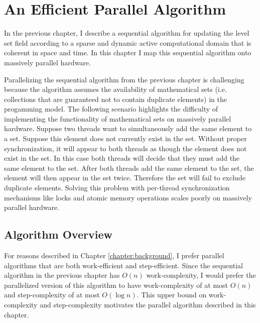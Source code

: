 \fancyhead[RO,LE]{\thepage}
\fancyfoot{} 
\chapter{An Efficient Parallel Algorithm}
\label{chapter:parallel}

In the previous chapter, I describe a sequential algorithm for updating the level set field according to a sparse and dynamic active computational domain that is coherent in space and time. In this chapter I map this sequential algorithm onto massively parallel hardware.

Parallelizing the sequential algorithm from the previous chapter is challenging because the algorithm assumes the availability of mathematical sets (i.e. collections that are guaranteed not to contain duplicate elements) in the progamming model. The following scenario highlights the difficulty of implementing the functionality of mathematical sets on massively parallel hardware. Suppose two threads want to simultaneously add the same element to a set. Suppose this element does not currently exist in the set. Without proper synchronization, it will appear to both threads as though the element does not exist in the set. In this case both threads will decide that they must add the same element to the set. After both threads add the same element to the set, the element will then appear in the set twice. Therefore the set will fail to exclude duplicate elements. Solving this problem with per-thread synchronization mechanisms like locks and atomic memory operations scales poorly on massively parallel hardware.

\section{Algorithm Overview}

For reasons described in Chapter \ref{chapter:background}, I prefer parallel algorithms that are both work-efficient and step-efficient. Since the sequential algorithm in the previous chapter has $O(n)$ work-complexity, I would prefer the parallelized version of this algorithm to have work-complexity of at most $O(n)$ and step-complexity of at most $O(\log n)$. This upper bound on work-complexity and step-complexity motivates the parallel algorithm described in this chapter.

